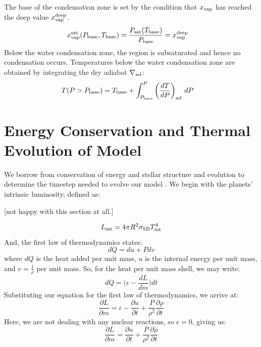 \documentclass[11pt]{ucscthesisbs}
\begin{document}
The base of the condensation zone is set by the condition that $x_{\rm vap}$ has reached the deep value $x_{\rm vap}^{\rm deep}$.
\begin{align}
x_{\rm vap}^{\rm sat}(P_{\rm base}, T_{\rm base}) &= \frac{P_{\rm sat}(T_{\rm base})}{P_{\rm base}}=x_{\rm vap}^{\rm deep}
\end{align}
Below the water condensation zone, the region is subsaturated and hence no condensation occurs. Temperatures below the water condensation zone are obtained by integrating the dry adiabat $\nabla_{\rm ad}$:
\begin{align}
T(P>P_{\rm base}) &= T_{\rm base} + \int_{P_{\rm base}}^P\left(\frac{dT}{dP}\right)_{\rm ad}\,d P
\label{eq:dry_adiabat_integration}
\end{align}


\section{Energy Conservation and Thermal Evolution of Model}
We borrow from conservation of energy and stellar structure and evolution to determine the timestep needed to evolve our model \citep{kippenhahn_2012}. We begin with the planets' intrinsic luminosity, defined as:

[not happy with this section at all.]

\begin{equation}
L_{\rm int} = 4\pi R^2\sigma_{\rm SB}T_{\rm int}^4
\label{eq:intrinsic_luminosity}
\end{equation}
And, the first law of thermodynamics states:
\begin{equation}
dQ = du + Pdv
\label{eq:first_law_thermodynamics}
\end{equation}
where $dQ$ is the heat added per unit mass, $u$ is the internal energy per unit mass, and $v = \frac{1}{\rho}$ per unit mass.
So, for the heat per unit mass shell, we may write:
\begin{equation}
dQ = \big(\epsilon - \frac{dL}{dm})dt
\label{eq:heat_per_unit_mass_shell}
\end{equation}
Substituting our equation for the first law of thermodynamics, we arrive at:
\begin{equation}
\frac{\partial L}{\partial m} = \epsilon - \frac{\partial u}{\partial t} + \frac{P}{\rho^2}\frac{\partial \rho}{\partial t}
\end{equation}
Here, we are not dealing with any nuclear reactions, so $\epsilon = 0$, giving us:
\begin{equation}
\frac{\partial L}{\partial m} = \frac{\partial u}{\partial t} + \frac{P}{\rho^2}\frac{\partial \rho}{\partial t}
\end{equation}
\end{document}
